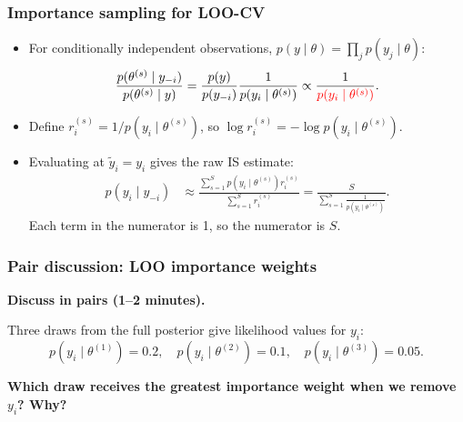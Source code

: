 \documentclass[10pt]{beamer}
\begin{document}
\begin{frame}
  \frametitle{Importance sampling for LOO-CV}

   \begin{itemize}
   \item For conditionally independent observations,
     $p(y\mid\theta)=\prod_j p(y_j\mid\theta)$:
     \begin{align*}
       \frac{p(\theta^{(s)}\mid y_{-i})}{p(\theta^{(s)}\mid y)}
       =\frac{p(y)}{p(y_{-i})}\frac{1}{p(y_i\mid\theta^{(s)})}
       \propto\frac{1}{\color{red}p(y_i\mid\theta^{(s)})}.
     \end{align*}
   \item Define $r_i^{(s)}=1/p(y_i\mid\theta^{(s)})$, so
     $\log r_i^{(s)}=-\log p(y_i\mid\theta^{(s)})$.
 \pause
   \item Evaluating at $\tilde y_i=y_i$ gives the raw IS estimate:
        \begin{align*}
       p(y_i\mid y_{-i})&\approx
       \frac{\sum_{s=1}^S p(y_i\mid\theta^{(s)})r_i^{(s)}}{\sum_{s=1}^S r_i^{(s)}}
       =\frac{S}{\sum_{s=1}^S\frac{1}{p(y_i\mid\theta^{(s)})}}.
     \end{align*}
     Each term in the numerator is 1, so the numerator is $S$.
   \end{itemize}
 \end{frame}

\begin{frame}
\frametitle{Pair discussion: LOO importance weights}

  {\color{uured}\textbf{Discuss in pairs (1--2 minutes).}}

  Three draws from the full posterior give likelihood values for $y_i$:
  \[
    p(y_i\mid\theta^{(1)})=0.2,\quad
    p(y_i\mid\theta^{(2)})=0.1,\quad
    p(y_i\mid\theta^{(3)})=0.05.
  \]

  \textbf{Which draw receives the greatest importance weight when we
    remove $y_i$? Why?}

\end{frame}
\end{document}
